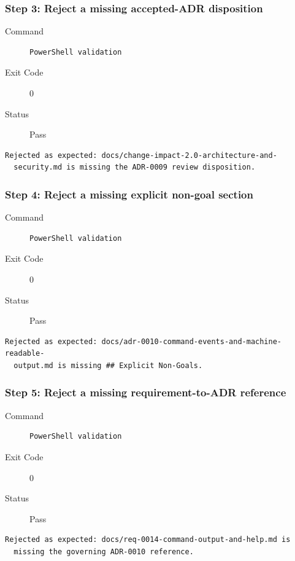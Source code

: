 \subsubsection*{Step 3: Reject a missing accepted-ADR disposition}
\begin{description}
\item[Command] \mbox{}
\begin{verbatim}
PowerShell validation
\end{verbatim}
\item[Exit Code] 0
\item[Status] Pass
\end{description}
\begin{verbatim}
Rejected as expected: docs/change-impact-2.0-architecture-and-
  security.md is missing the ADR-0009 review disposition.
\end{verbatim}
\subsubsection*{Step 4: Reject a missing explicit non-goal section}
\begin{description}
\item[Command] \mbox{}
\begin{verbatim}
PowerShell validation
\end{verbatim}
\item[Exit Code] 0
\item[Status] Pass
\end{description}
\begin{verbatim}
Rejected as expected: docs/adr-0010-command-events-and-machine-readable-
  output.md is missing ## Explicit Non-Goals.
\end{verbatim}
\subsubsection*{Step 5: Reject a missing requirement-to-ADR reference}
\begin{description}
\item[Command] \mbox{}
\begin{verbatim}
PowerShell validation
\end{verbatim}
\item[Exit Code] 0
\item[Status] Pass
\end{description}
\begin{verbatim}
Rejected as expected: docs/req-0014-command-output-and-help.md is
  missing the governing ADR-0010 reference.
\end{verbatim}
